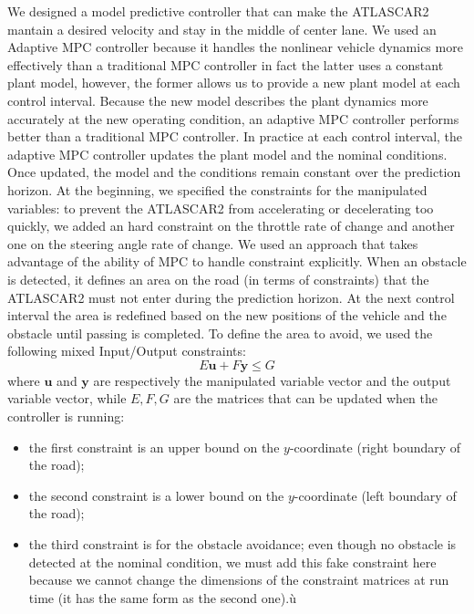 \documentclass[conference, 11pt]{IEEEtran}
\begin{document}
We designed a model predictive controller that can make the ATLASCAR2 mantain a desired velocity and stay in the middle of center lane. We used an Adaptive MPC controller because it handles the nonlinear vehicle dynamics more effectively than a traditional MPC controller in fact the latter uses a constant plant model, however, the former allows us to provide a new plant model at each control interval. Because the new model describes the plant dynamics more accurately at the new operating condition, an adaptive MPC controller performs better than a traditional MPC controller. In practice at each control interval, the adaptive MPC controller updates the plant model and the nominal conditions. Once updated, the model and the conditions remain constant over the prediction horizon. At the beginning, we specified the constraints for the manipulated variables: to prevent the ATLASCAR2 from accelerating or decelerating too quickly, we added an hard constraint on the throttle rate of change and another one on the steering angle rate of change. We used an approach that takes advantage of the ability of MPC to handle constraint explicitly. When an obstacle is detected, it defines an area on the road (in terms of constraints) that the ATLASCAR2 must not enter during the prediction horizon. At the next control interval the area is redefined based on the new positions of the vehicle and the obstacle until passing is completed.
To define the area to avoid, we used the following mixed Input/Output constraints:
\begin{equation*}
	\label{eqn:mixed_IO_constraints}
	E\textbf{u}+F\textbf{y}\leq G
\end{equation*}
where $\textbf{u}$ and $\textbf{y}$ are respectively the manipulated variable vector and the output variable vector, while $E,F,G$ are the matrices that can be updated when the controller is running:
\begin{itemize}
	\item the first constraint is an upper bound on the $y$-coordinate (right boundary of the road);
	\item the second constraint is a lower bound on the $y$-coordinate (left boundary of the road);
	\item the third constraint is for the obstacle avoidance; even though no obstacle is detected at the nominal condition, we must add this fake constraint here because we cannot change the dimensions of the constraint matrices at run time (it has the same form as the second one).ù
\end{itemize}
\end{document}

